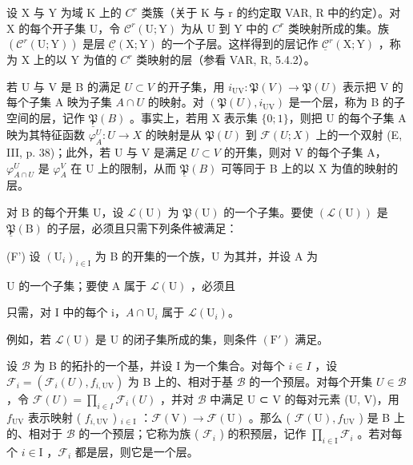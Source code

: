 
设 X 与 Y 为域 K 上的 \(C^{r}\) 类簇（关于 K 与 r 的约定取 VAR, R 中的约定）。对 X 的每个开子集 U，令 \(\mathcal{C}^{r}(\mathrm{U};\mathrm{Y})\) 为从 U 到 Y 中的 \(C^{r}\) 类映射所成的集。族 \((\mathcal{C}^{r}(\mathrm{U};\mathrm{Y}))\) 是层 \(\underline{\mathcal{C}}(\mathrm{X};\mathrm{Y})\) 的一个子层。这样得到的层记作 \(\underline{\mathcal{C}}^{r}(\mathrm{X};\mathrm{Y})\) ，称为 X 上的以 Y 为值的 \(C^{r}\) 类映射的层（参看 VAR, R, 5.4.2）。


若 U 与 V 是 B 的满足 \(U \subset V\) 的开子集，用 \(i_{\mathrm{UV}}: \mathfrak{P}(V) \to \mathfrak{P}(U)\) 表示把 V 的每个子集 A 映为子集 \(A \cap U\) 的映射。对 \((\mathfrak{P}(U), i_{\mathrm{UV}})\) 是一个层，称为 B 的子空间的层，记作 \(\underline{\mathfrak{P}}(B)\) 。事实上，若用 X 表示集 \(\{0;1\}\)，则把 U 的每个子集 A 映为其特征函数 \(\varphi_{A}^{U}: U \to X\) 的映射是从 \(\mathfrak{P}(U)\) 到 \(\mathcal{F}(U;X)\) 上的一个双射 (E, III, p. 38)；此外，若 U 与 V 是满足 \(U \subset V\) 的开集，则对 V 的每个子集 A，\(\varphi_{A \cap U}^{U}\) 是 \(\varphi_{A}^{V}\) 在 U 上的限制，从而 \(\underline{\mathfrak{P}}(B)\) 可等同于 B 上的以 X 为值的映射的层。

对 B 的每个开集 U，设 \(\mathcal{L}(\mathrm{U})\) 为 \(\mathfrak{P}(\mathrm{U})\) 的一个子集。要使 \((\mathcal{L}(\mathrm{U}))\) 是 \(\underline{\mathfrak{P}}(\mathrm{B})\) 的子层，必须且只需下列条件被满足：

(F') 设 \((\mathrm{U}_{i})_{i\in\mathrm{I}}\) 为 B 的开集的一个族，U 为其并，并设 A 为

U 的一个子集；要使 A 属于 \(\mathcal{L}(\mathrm{U})\) ，必须且

只需，对 I 中的每个 i，\(A \cap \mathrm{U}_{i}\) 属于 \(\mathcal{L}(\mathrm{U}_{i})\)。

例如，若 \(\mathcal{L}(\mathrm{U})\) 是 U 的闭子集所成的集，则条件 \((\mathrm{F}')\) 满足。


设 \(\mathcal{B}\) 为 B 的拓扑的一个基，并设 I 为一个集合。对每个 \(i \in I\) ，设 \(\mathcal{F}_{i} = (\mathcal{F}_{i}(U), f_{i,\mathrm{UV}})\) 为 B 上的、相对于基 \(\mathcal{B}\) 的一个预层。对每个开集 \(U \in \mathcal{B}\) ，令 \(\mathcal{F}(U) = \prod_{i \in I} \mathcal{F}_{i}(U)\) ，并对 \(\mathcal{B}\) 中满足 U ⊂ V 的每对元素 (U, V)，用 \(f_{\mathrm{UV}}\) 表示映射 ( \(f_{i,\mathrm{UV}}\) ) \(_{i\in\mathrm{I}}\) ：\(\mathcal{F}(\mathrm{V}) \to \mathcal{F}(\mathrm{U})\) 。那么 ( \(\mathcal{F}(\mathrm{U}), f_{\mathrm{UV}} \) ) 是 B 上的、相对于 \(\mathcal{B}\) 的一个预层；它称为族 ( \(\mathcal{F}_i\) ) 的积预层，记作 \(\prod_{i\in\mathrm{I}}\mathcal{F}_i\) 。若对每个 \(i \in \mathrm{I}\) ，\(\mathcal{F}_i\) 都是层，则它是一个层。

